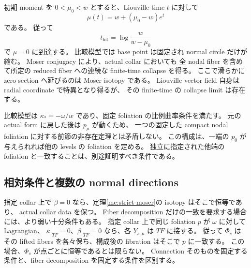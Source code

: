 初期 moment を $0<\mu_0<w$ とすると、Liouville time $t$ に対して
\[
 \mu(t)=w+(\mu_0-w)e^t
\]
である。
従って
\begin{equation}
 t_{\mathrm{hit}}=\log\frac{w}{w-\mu_0}
 \label{mc:collapse-time}
\end{equation}
で $\mu=0$ に到達する。
比較模型では base point は固定され normal circle だけが縮む。
Moser conjugacy により、actual collar においても
全 nodal fiber を含めて所定の reduced fiber への連続な finite-time collapse を得る。
ここで滑らかに zero section へ延びるのは Moser isotopy である。
Liouville vector field 自身は radial coordinate で特異となり得るが、
その finite-time の collapse limit は存在する。

\begin{remark}
比較模型は $\kappa_*=-\omega/w$ であり、固定 foliation の比例曲率条件を満たす。
元の actual form に戻した後は $p_\mu$ が動くため、
一つの固定した compact nodal foliation に対する前節の非存在定理とは矛盾しない。
この構成は、一端の $p_0$ が与えられれば他の levels の foliation を定める。
独立に指定された他端の foliation と一致することは、別途証明すべき条件である。
\end{remark}

\subsection{相対条件と複数の normal directions}
\label{mc:multi}

指定 collar 上で $\beta=0$ なら、定理\ref{mc:strict-moser}の isotopy はそこで恒等であり、
actual collar data を保つ。
Fiber decomposition だけの一致を要求する場合には、より弱い十分条件もある。
指定 collar 上で同じ foliation $p$ が $\omega$ に対して Lagrangian、
$\kappa|_{TF}=0$、$\beta|_{TF}=0$ なら、各 $Y_{s,\mu}$ は $TF$ に接する。
従って $\Phi_s$ はその lifted fibers を各々保ち、構成後の fibration はそこで $p$ に一致する。
この場合、$\Phi_s$ が点ごとに恒等であるとは限らない。
Connection そのものを固定する条件と、fiber decomposition を固定する条件を区別する。

